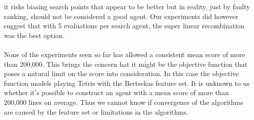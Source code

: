 \begin{changebar}
it risks biasing search points that appear to be better 
but in reality, just by faulty ranking, should
not be considered a good agent. Our experiments 
did however suggest that with 5 evaluations per search agent,
the super linear recombination was the best option.\\
\\
None of the experiments seen so far has allowed a 
consistent mean score of more 
than 200,000. This brings the concern 
hat it might be the objective function
that poses a natural limit on the score into consideration.
In this case the objective function
models playing Tetris with the Bertsekas feature set. 
It is unknown to us
whether it's possible to construct an agent 
with a mean score of more than
200,000 lines on average. 
Thus we cannot know if convergence 
of the algorithms are caused by the feature set or limitations in the
algorithms.
\end{changebar}
